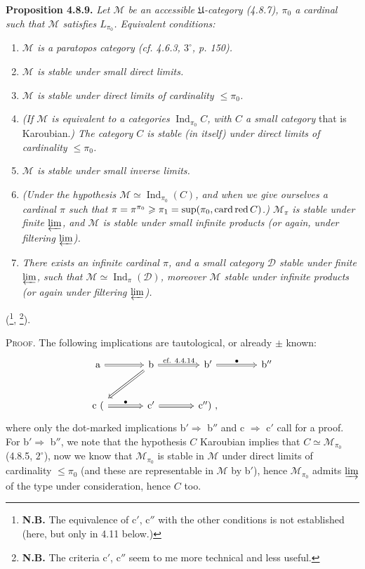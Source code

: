 \documentclass[11pt]{article}
\newcommand{\msp}[1]{\marginpar{\footnotesize [#1]}}
\newcommand{\Ind}{\operatorname{Ind}}
\newcommand{\card}{\operatorname{card}}
\begin{document}
\msp{page 207}
\textbf{Proposition 4.8.9.} \textit{Let $\mathcal{M}$ be an accessible $\mathfrak{U}$-category (4.8.7), $\pi_0$ a cardinal such that $\mathcal{M}$ satisfies $L_{\pi_0}$. Equivalent conditions:}
\begin{enumerate}
\item[\textit{a)}] \textit{$\mathcal{M}$ is a paratopos category (cf. 4.6.3, $3^\circ$, p. 150).}
\item[\textit{b)}] \textit{$\mathcal{M}$ is stable under small direct limits.}
\item[\textit{b$'$)}] \textit{$\mathcal{M}$ is stable under direct limits of cardinality $\leqslant\pi_0$.}
\item[\textit{b$''$)}] \textit{(If $\mathcal{M}$ is equivalent to a categories} $\Ind_{\pi_0}C$\textit{, with $C$ a small category} that is Karoubian.\textit{) The category $C$ is stable (in itself) under direct limits of cardinality $\leqslant\pi_0$.} %
\item[\textit{c)}] \textit{$\mathcal{M}$ is stable under small inverse limits.}
\item[\textit{c$'$)}] \textit{(Under the hypothesis $\mathcal{M}\simeq\Ind_{\pi_0}(C)$, and when we give ourselves a cardinal $\pi$ such that $\pi=\pi^{\pi_0}\geqslant\pi_1=\sup(\pi_0,\card\textup{red}\,C)$.) $\mathcal{M}_\pi$ is stable under finite $\varprojlim$, and $\mathcal{M}$ is stable under small infinite products (or again, under filtering $\varprojlim$).}
\item[\textit{c$''$)}] \textit{There exists an infinite cardinal $\pi$, and a small category $\mathcal{D}$ stable under finite $\varprojlim$, such that $\mathcal{M}\simeq\Ind_\pi(\mathcal{D})$, moreover $\mathcal{M}$ stable under infinite products (or again under filtering $\varprojlim$).}
\end{enumerate}
(\footnote{\textbf{N.B.} The equivalence of c$'$, c$''$ with the other conditions is not established (here, but only in 4.11 below.)}, \footnote{\textbf{N.B.} The criteria c$'$, c$''$ seem to me more technical and less useful.}).

\textsc{Proof.} The following implications are tautological, or already $\pm$ known:
\[
\begin{tikzcd}[column sep=large, row sep=large]
\mathrm{a} \arrow[r, Rightarrow] & \mathrm{b} \arrow[r, Rightarrow, "\text{cf. 4.4.14}"] \arrow[dl, Rightarrow] & \mathrm{b}' \arrow[r, Rightarrow, "\bullet"] & \mathrm{b}'' \\
\mathrm{c}\ ( \arrow[r, Rightarrow, "\bullet"] & \mathrm{c}' \arrow[r, Rightarrow] & \mathrm{c}'')\ , &
\end{tikzcd}
\]
\msp{page 208}
where only the dot-marked implications b$'\Longrightarrow$ b$''$ and c $\Longrightarrow$ c$'$ call for a proof. For b$'\Longrightarrow$ b$''$, we note that the hypothesis $C$ Karoubian implies that $C\simeq\mathcal{M}_{\pi_0}$ (4.8.5, $2^\circ$), now we know that $\mathcal{M}_{\pi_0}$ is stable in $\mathcal{M}$ under direct limits of cardinality $\leqslant\pi_0$ (and these are representable in $\mathcal{M}$ by b$'$), hence $\mathcal{M}_{\pi_0}$ admits $\varinjlim$ of the type under consideration, hence $C$ too.
\end{document}
